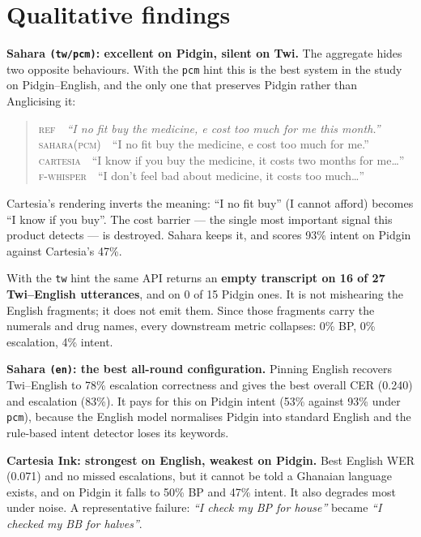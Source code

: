 \documentclass[a4paper,10pt,twocolumn]{article}
\begin{document}
\section{Qualitative findings}

\textbf{Sahara \texttt{(tw/pcm)}: excellent on Pidgin, silent on Twi.} The
aggregate hides two opposite behaviours. With the \texttt{pcm} hint this is the
best system in the study on Pidgin--English, and the only one that preserves
Pidgin rather than Anglicising it:

\begin{quote}\small
\textsc{ref}\ \ \emph{``I no fit buy the medicine, e cost too much for me this month.''}\\[2pt]
\textsc{sahara(pcm)}\ \ ``I no fit buy the medicine, e cost too much for me.''\\[2pt]
\textsc{cartesia}\ \ ``I know if you buy the medicine, it costs two months for me\ldots''\\[2pt]
\textsc{f-whisper}\ \ ``I don't feel bad about medicine, it costs too much\ldots''
\end{quote}

\noindent
Cartesia's rendering inverts the meaning: ``I no fit buy'' (I cannot afford)
becomes ``I know if you buy''. The cost barrier --- the single most important
signal this product detects --- is destroyed. Sahara keeps it, and scores 93\%
intent on Pidgin against Cartesia's 47\%.

With the \texttt{tw} hint the same API returns an \textbf{empty transcript on 16
of 27 Twi--English utterances}, and on 0 of 15 Pidgin ones. It is not mishearing
the English fragments; it does not emit them. Since those fragments carry the
numerals and drug names, every downstream metric collapses: 0\% BP, 0\%
escalation, 4\% intent.

\textbf{Sahara \texttt{(en)}: the best all-round configuration.} Pinning English
recovers Twi--English to 78\% escalation correctness and gives the best overall
CER (0.240) and escalation (83\%). It pays for this on Pidgin intent (53\%
against 93\% under \texttt{pcm}), because the English model normalises Pidgin
into standard English and the rule-based intent detector loses its keywords.

\textbf{Cartesia Ink: strongest on English, weakest on Pidgin.} Best English WER
(0.071) and no missed escalations, but it cannot be told a Ghanaian language
exists, and on Pidgin it falls to 50\% BP and 47\% intent. It also degrades most
under noise. A representative failure: \emph{``I check my BP for house''} became
\emph{``I checked my BB for halves''}.
\end{document}
